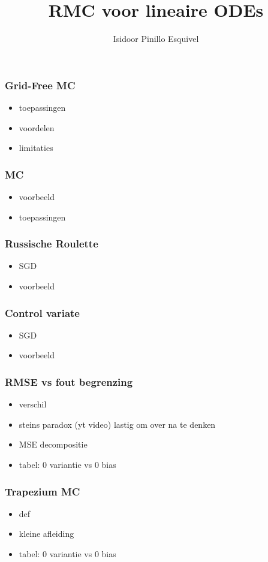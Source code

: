 \documentclass[20pt]{beamer}
\title{RMC voor lineaire ODEs}
\author{Isidoor Pinillo Esquivel }
\date{}
\begin{document}
\begin{frame}
    \titlepage
\end{frame}

\begin{frame}
    \frametitle{Grid-Free MC}
    \begin{itemize}
        \item toepassingen
        \item voordelen
        \item limitaties
    \end{itemize}
\end{frame}

\begin{frame}
    \frametitle{MC}
    \begin{itemize}
        \item voorbeeld
        \item toepassingen
    \end{itemize}
\end{frame}

\begin{frame}
    \frametitle{Russische Roulette}
    \begin{itemize}
        \item SGD
        \item voorbeeld
    \end{itemize}
\end{frame}

\begin{frame}
    \frametitle{Control variate}
    \begin{itemize}
        \item SGD
        \item voorbeeld
    \end{itemize}
\end{frame}

\begin{frame}
    \frametitle{RMSE vs fout begrenzing}
    \begin{itemize}
        \item verschil
        \item steins paradox (yt video) lastig om over na te denken
        \item MSE decompositie
        \item tabel: $0$ variantie vs $0$ bias
    \end{itemize}
\end{frame}

\begin{frame}
    \frametitle{Trapezium MC}
    \begin{itemize}
        \item def
        \item kleine afleiding
        \item tabel: $0$ variantie vs $0$ bias
    \end{itemize}
\end{frame}
\end{document}
